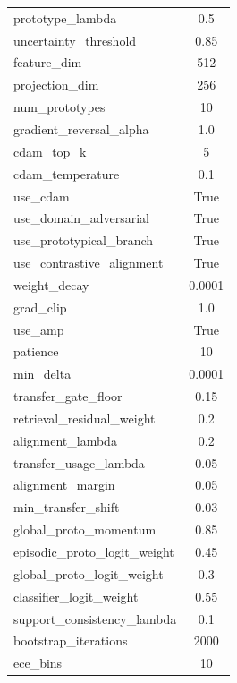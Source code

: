 \begin{table}[t]
{\begin{tabular}{@{}lc@{}}
prototype\_lambda & 0.5 \\
uncertainty\_threshold & 0.85 \\
feature\_dim & 512 \\
projection\_dim & 256 \\
num\_prototypes & 10 \\
gradient\_reversal\_alpha & 1.0 \\
cdam\_top\_k & 5 \\
cdam\_temperature & 0.1 \\
use\_cdam & True \\
use\_domain\_adversarial & True \\
use\_prototypical\_branch & True \\
use\_contrastive\_alignment & True \\
weight\_decay & 0.0001 \\
grad\_clip & 1.0 \\
use\_amp & True \\
patience & 10 \\
min\_delta & 0.0001 \\
transfer\_gate\_floor & 0.15 \\
retrieval\_residual\_weight & 0.2 \\
alignment\_lambda & 0.2 \\
transfer\_usage\_lambda & 0.05 \\
alignment\_margin & 0.05 \\
min\_transfer\_shift & 0.03 \\
global\_proto\_momentum & 0.85 \\
episodic\_proto\_logit\_weight & 0.45 \\
global\_proto\_logit\_weight & 0.3 \\
classifier\_logit\_weight & 0.55 \\
support\_consistency\_lambda & 0.1 \\
bootstrap\_iterations & 2000 \\
ece\_bins & 10 \\
\bottomrule
\end{tabular}%
}
\end{table}